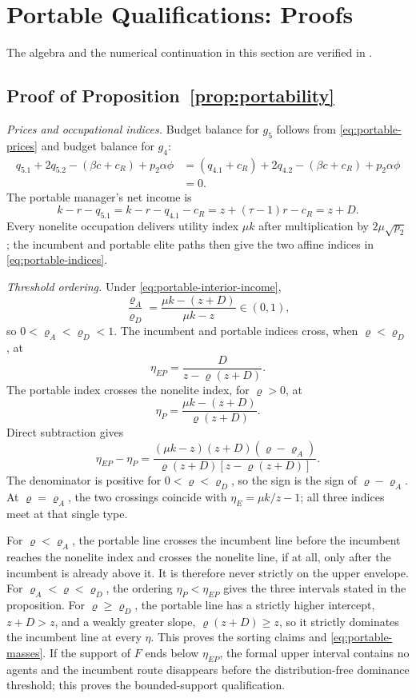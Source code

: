 \documentclass[12pt,letterpaper]{article}
\theoremstyle{definition}
\begin{document}
\section{Portable Qualifications: Proofs}\label{app:portability}

The algebra and the numerical continuation in this section are verified in
.

\subsection{Proof of Proposition~\ref{prop:portability}}

\emph{Prices and occupational indices.}
Budget balance for $g_5$ follows from \eqref{eq:portable-prices} and budget balance for
$g_4$:
\[
\begin{aligned}
q_{5.1}+2q_{5.2}-(\beta c+c_R)+p_2\alpha\phi
&=(q_{4.1}+c_R)+2q_{4.2}-(\beta c+c_R)+p_2\alpha\phi\\
&=0.
\end{aligned}
\]
The portable manager's net income is
\[
k-r-q_{5.1}
=k-r-q_{4.1}-c_R
=z+(\tau-1)r-c_R
=z+D.
\]
Every nonelite occupation delivers utility index $\mu k$ after multiplication by
$2\mu\sqrt{p_2}$; the incumbent and portable elite paths then give the two affine
indices in \eqref{eq:portable-indices}.

\emph{Threshold ordering.}
Under \eqref{eq:portable-interior-income},
\[
\frac{\varrho_A}{\varrho_D}
=
\frac{\mu k-(z+D)}{\mu k-z}
\in(0,1),
\]
so $0<\varrho_A<\varrho_D<1$.
The incumbent and portable indices cross, when $\varrho<\varrho_D$, at
\[
\eta_{EP}
=
\frac{D}{z-\varrho(z+D)}.
\]
The portable index crosses the nonelite index, for $\varrho>0$, at
\[
\eta_P
=
\frac{\mu k-(z+D)}{\varrho(z+D)}.
\]
Direct subtraction gives
\[
\eta_{EP}-\eta_P
=
\frac{(\mu k-z)(z+D)(\varrho-\varrho_A)}
{\varrho(z+D)[z-\varrho(z+D)]}.
\]
The denominator is positive for $0<\varrho<\varrho_D$, so the sign is the sign of
$\varrho-\varrho_A$.
At $\varrho=\varrho_A$, the two crossings coincide with
$\eta_E=\mu k/z-1$; all three indices meet at that single type.

For $\varrho<\varrho_A$, the portable line crosses the incumbent line before the
incumbent reaches the nonelite index and crosses the nonelite line, if at all, only after
the incumbent is already above it.
It is therefore never strictly on the upper envelope.
For $\varrho_A<\varrho<\varrho_D$, the ordering
$\eta_P<\eta_{EP}$ gives the three intervals stated in the proposition.
For $\varrho\geq\varrho_D$, the portable line has a strictly higher intercept,
$z+D>z$, and a weakly greater slope,
$\varrho(z+D)\geq z$, so it strictly dominates the incumbent line at every $\eta$.
This proves the sorting claims and \eqref{eq:portable-masses}.
If the support of $F$ ends below $\eta_{EP}$, the formal upper interval contains no
agents and the incumbent route disappears before the distribution-free dominance
threshold; this proves the bounded-support qualification.
\end{document}
